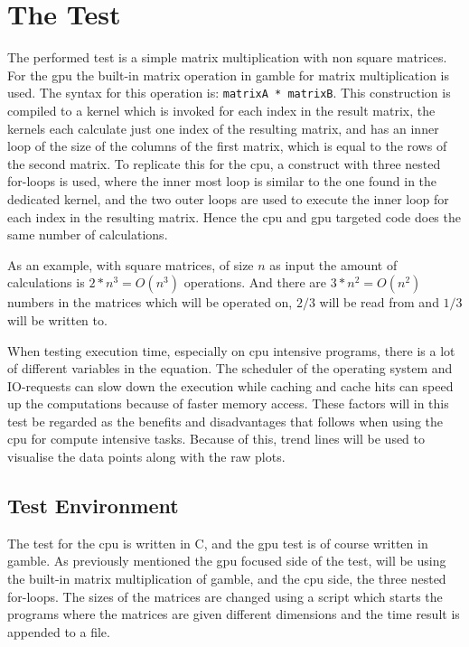 \section{The Test} %
\label{sec:the_test}
The performed test is a simple matrix multiplication with non square matrices.
For the \gls{gpu} the built-in matrix operation in \gls{gamble} for matrix multiplication is used. 
The syntax for this operation is: \texttt{matrixA * matrixB}. 
This construction is compiled to a kernel which is invoked for each index in the result matrix, the kernels each calculate just one index of the resulting matrix, and has an inner loop of the size of the columns of the first matrix, which is equal to the rows of the second matrix.
To replicate this for the \gls{cpu}, a construct with three nested for-loops is used, where the inner most loop is similar to the one found in the dedicated kernel, and the two outer loops are used to execute the inner loop for each index in the resulting matrix.
Hence the \gls{cpu} and \gls{gpu} targeted code does the same number of calculations.
 
As an example, with square matrices, of size $n$ as input the amount of calculations is $2*n^3 = O(n^3)$ operations. 
And there are $3*n^2 = O(n^2)$ numbers in the matrices which will be operated on, $2/3$ will be read from and $1/3$ will be written to.

When testing execution time, especially on \gls{cpu} intensive programs, there is a lot of different variables in the equation. 
The scheduler of the operating system and IO-requests can slow down the execution while caching and cache hits can speed up the computations because of faster memory access. 
These factors will in this test be regarded as the benefits and disadvantages that follows when using the \gls{cpu} for compute intensive tasks.
Because of this, trend lines will be used to visualise the data points along with the raw plots. 

\subsection{Test Environment} %
\label{sub:test_environment}
The test for the \acrshort{cpu} is written in C, and the \acrshort{gpu} test is of course written in \gls{gamble}.
As previously mentioned the \gls{gpu} focused side of the test, will be using the built-in matrix multiplication of \gls{gamble}, and the \gls{cpu} side, the three nested for-loops.
The sizes of the matrices are changed using a script which starts the programs where the matrices are given different dimensions and the time result is appended to a file.

